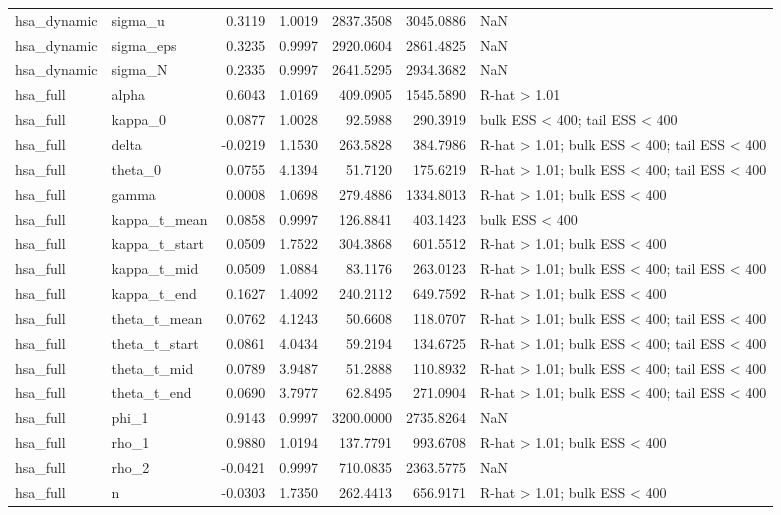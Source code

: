 \begin{tabular}{llrrrrl}
hsa\_dynamic & sigma\_u & 0.3119 & 1.0019 & 2837.3508 & 3045.0886 & NaN \\
hsa\_dynamic & sigma\_eps & 0.3235 & 0.9997 & 2920.0604 & 2861.4825 & NaN \\
hsa\_dynamic & sigma\_N & 0.2335 & 0.9997 & 2641.5295 & 2934.3682 & NaN \\
hsa\_full & alpha & 0.6043 & 1.0169 & 409.0905 & 1545.5890 & R-hat > 1.01 \\
hsa\_full & kappa\_0 & 0.0877 & 1.0028 & 92.5988 & 290.3919 & bulk ESS < 400; tail ESS < 400 \\
hsa\_full & delta & -0.0219 & 1.1530 & 263.5828 & 384.7986 & R-hat > 1.01; bulk ESS < 400; tail ESS < 400 \\
hsa\_full & theta\_0 & 0.0755 & 4.1394 & 51.7120 & 175.6219 & R-hat > 1.01; bulk ESS < 400; tail ESS < 400 \\
hsa\_full & gamma & 0.0008 & 1.0698 & 279.4886 & 1334.8013 & R-hat > 1.01; bulk ESS < 400 \\
hsa\_full & kappa\_t\_mean & 0.0858 & 0.9997 & 126.8841 & 403.1423 & bulk ESS < 400 \\
hsa\_full & kappa\_t\_start & 0.0509 & 1.7522 & 304.3868 & 601.5512 & R-hat > 1.01; bulk ESS < 400 \\
hsa\_full & kappa\_t\_mid & 0.0509 & 1.0884 & 83.1176 & 263.0123 & R-hat > 1.01; bulk ESS < 400; tail ESS < 400 \\
hsa\_full & kappa\_t\_end & 0.1627 & 1.4092 & 240.2112 & 649.7592 & R-hat > 1.01; bulk ESS < 400 \\
hsa\_full & theta\_t\_mean & 0.0762 & 4.1243 & 50.6608 & 118.0707 & R-hat > 1.01; bulk ESS < 400; tail ESS < 400 \\
hsa\_full & theta\_t\_start & 0.0861 & 4.0434 & 59.2194 & 134.6725 & R-hat > 1.01; bulk ESS < 400; tail ESS < 400 \\
hsa\_full & theta\_t\_mid & 0.0789 & 3.9487 & 51.2888 & 110.8932 & R-hat > 1.01; bulk ESS < 400; tail ESS < 400 \\
hsa\_full & theta\_t\_end & 0.0690 & 3.7977 & 62.8495 & 271.0904 & R-hat > 1.01; bulk ESS < 400; tail ESS < 400 \\
hsa\_full & phi\_1 & 0.9143 & 0.9997 & 3200.0000 & 2735.8264 & NaN \\
hsa\_full & rho\_1 & 0.9880 & 1.0194 & 137.7791 & 993.6708 & R-hat > 1.01; bulk ESS < 400 \\
hsa\_full & rho\_2 & -0.0421 & 0.9997 & 710.0835 & 2363.5775 & NaN \\
hsa\_full & n & -0.0303 & 1.7350 & 262.4413 & 656.9171 & R-hat > 1.01; bulk ESS < 400 \\

\end{tabular}
